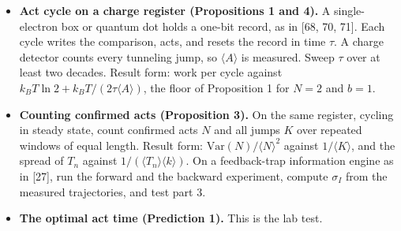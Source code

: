 \documentclass[
  10pt,
]{article}
\providecommand{\tightlist}{%
  \setlength{\itemsep}{0pt}\setlength{\parskip}{0pt}}
\begin{document}
\begin{itemize}
\tightlist
\item
  \textbf{Act cycle on a charge register (Propositions 1 and 4).} A
  single-electron box or quantum dot holds a one-bit record, as in
  {[}68, 70, 71{]}. Each cycle writes the comparison, acts, and resets
  the record in time \(\tau\). A charge detector counts every tunneling
  jump, so \(\langle A\rangle\) is measured. Sweep \(\tau\) over at
  least two decades. Result form: work per cycle against
  \(k_B T\ln 2 + k_B T/(2\tau\langle A\rangle)\), the floor of
  Proposition 1 for \(N = 2\) and \(b = 1\).
\item
  \textbf{Counting confirmed acts (Proposition 3).} On the same
  register, cycling in steady state, count confirmed acts \(N\) and all
  jumps \(K\) over repeated windows of equal length. Result form:
  \(\mathrm{Var}(N)/\langle N\rangle^2\) against \(1/\langle K\rangle\),
  and the spread of \(T_n\) against
  \(1/(\langle T_n\rangle\langle k\rangle)\). On a feedback-trap
  information engine as in {[}27{]}, run the forward and the backward
  experiment, compute \(\sigma_I\) from the measured trajectories, and
  test part 3.
\item
  \textbf{The optimal act time (Prediction 1).} This is the lab test.


\end{itemize}
\end{document}
